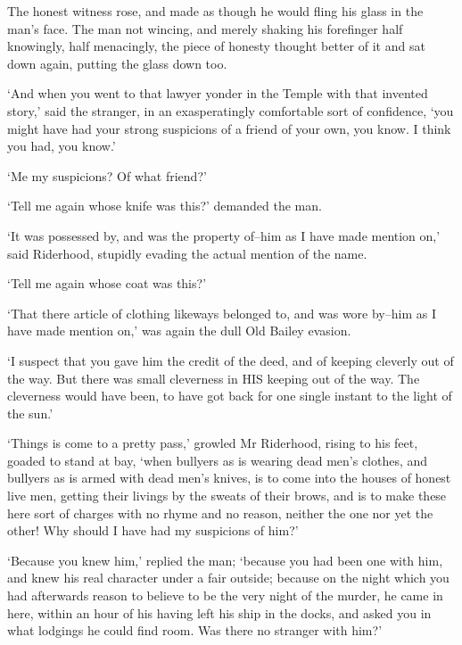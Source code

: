 The honest witness rose, and made as though he would fling his glass in
the man’s face. The man not wincing, and merely shaking his forefinger
half knowingly, half menacingly, the piece of honesty thought better of
it and sat down again, putting the glass down too.

‘And when you went to that lawyer yonder in the Temple with that
invented story,’ said the stranger, in an exasperatingly comfortable
sort of confidence, ‘you might have had your strong suspicions of a
friend of your own, you know. I think you had, you know.’

‘Me my suspicions? Of what friend?’

‘Tell me again whose knife was this?’ demanded the man.

‘It was possessed by, and was the property of--him as I have made
mention on,’ said Riderhood, stupidly evading the actual mention of the
name.

‘Tell me again whose coat was this?’

‘That there article of clothing likeways belonged to, and was wore
by--him as I have made mention on,’ was again the dull Old Bailey
evasion.

‘I suspect that you gave him the credit of the deed, and of keeping
cleverly out of the way. But there was small cleverness in HIS keeping
out of the way. The cleverness would have been, to have got back for one
single instant to the light of the sun.’

‘Things is come to a pretty pass,’ growled Mr Riderhood, rising to his
feet, goaded to stand at bay, ‘when bullyers as is wearing dead men’s
clothes, and bullyers as is armed with dead men’s knives, is to come
into the houses of honest live men, getting their livings by the sweats
of their brows, and is to make these here sort of charges with no rhyme
and no reason, neither the one nor yet the other! Why should I have had
my suspicions of him?’

‘Because you knew him,’ replied the man; ‘because you had been one with
him, and knew his real character under a fair outside; because on the
night which you had afterwards reason to believe to be the very night of
the murder, he came in here, within an hour of his having left his ship
in the docks, and asked you in what lodgings he could find room. Was
there no stranger with him?’

